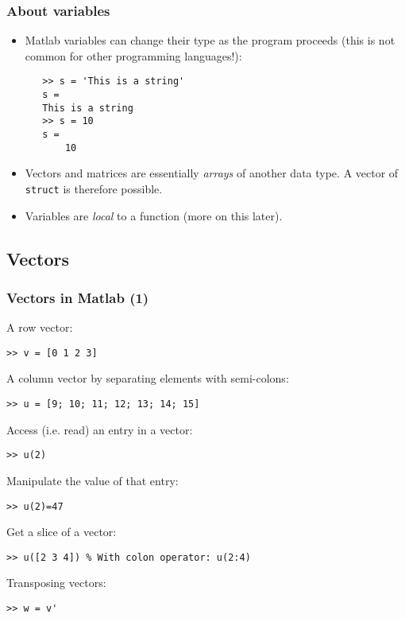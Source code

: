    \begin{frame}[fragile]
    \frametitle{About variables}
    \begin{itemize}
      \item Matlab variables can change their type as the program proceeds (this is not common for other programming languages!):
      \begin{lstlisting}
   >> s = 'This is a string'
   s =
   This is a string
   >> s = 10
   s =
       10
   \end{lstlisting}
       \item Vectors and matrices are essentially \emph{arrays} of another data type. A vector of \lstinline$struct$ is therefore possible.
       \item Variables are \emph{local} to a function (more on this later).
   \end{itemize}
   \end{frame}

\subsection*{Vectors}
\begin{frame}[fragile]
  \frametitle{Vectors in Matlab (1)}
  A row vector:
  \begin{lstlisting}
>> v = [0 1 2 3]
  \end{lstlisting}\pause
  A column vector by separating elements with semi-colons:
  \begin{lstlisting}
>> u = [9; 10; 11; 12; 13; 14; 15]
  \end{lstlisting}\pause
  Access (i.e. read) an entry in a vector:
  \begin{lstlisting}
>> u(2)
  \end{lstlisting}\pause
  Manipulate the value of that entry:
  \begin{lstlisting}
>> u(2)=47
  \end{lstlisting}\pause
  Get a slice of a vector:
  \begin{lstlisting}
>> u([2 3 4]) % With colon operator: u(2:4)
  \end{lstlisting}\pause
  Transposing vectors:
  \begin{lstlisting}
>> w = v'
  \end{lstlisting}
\end{frame}

